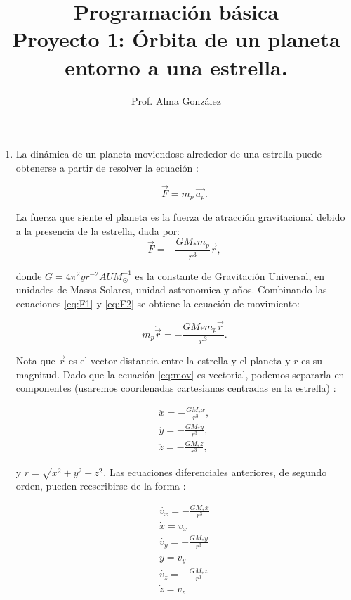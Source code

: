 \documentclass[a4paper,10pt]{article}
\title{\vspace{-5cm} Programación básica\\ 
Proyecto 1: \'Orbita de un planeta  entorno a una estrella.}
\author{Prof. Alma González}
\begin{document}
\maketitle
\begin{enumerate}

\item 
La dinámica de un planeta moviendose alrededor de una estrella puede obtenerse a partir de resolver la ecuación :

\begin{equation}
\vec{F}=m_p\,\vec{a_p}.
\label{eq:F1}
\end{equation}

La fuerza que siente el planeta  es la fuerza de atracción gravitacional debido a la presencia de la estrella, dada por: 
\begin{equation}
\vec{F}=-\frac{G M_{*} m_p}{r^3}\vec{r},
\label{eq:F2}
\end{equation}

donde $G=4\pi^2 yr^{-2} AU M_{\odot}^{-1}$ es la constante de Gravitación Universal, en unidades de Masas Solares, unidad astronomica y años.  Combinando las ecuaciones  \ref{eq:F1} y \ref{eq:F2} se obtiene la ecuación de movimiento:

\begin{equation}
m_p \ddot{\vec{r}}=- \frac{G M_{*} m_{p} \vec{r}}{r^3}.
\label{eq:mov}
\end{equation}

Nota que $\vec{r}$ es el vector distancia entre la estrella y el planeta y $r$ es su magnitud.  Dado que la ecuación \ref{eq:mov} es vectorial, podemos separarla en  componentes (usaremos coordenadas cartesianas centradas en la estrella) :

\begin{eqnarray}
 \ddot{x}=-\frac{G M_{*} x}{r^3},\\
  \ddot{y}=-\frac{G M_{*} y}{r^3},\\
 \ddot{z}=-\frac{G M_{*} z}{r^3},
\end{eqnarray}

y $r=\sqrt{x^2+y^2+z^2}$. Las ecuaciones diferenciales anteriores, de segundo orden, pueden reescribirse de la forma :

\begin{eqnarray}
 \dot{v_x}=-\frac{G M_{*} x}{r^3}\\
 \dot{x}=v_x\\
  \dot{v_y}=-\frac{G M_{*} y}{r^3}\\
  \dot{y}=v_y\\
 \dot{v_z}=-\frac{G M_{*} z}{r^3}\\
  \dot{z}=v_z
\end{eqnarray}


\end{enumerate}
\end{document}
